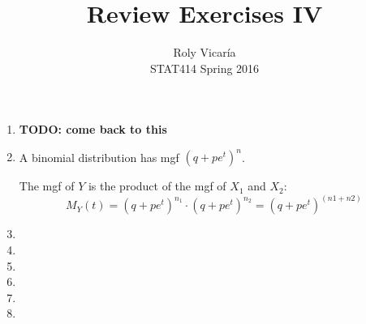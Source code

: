 \documentclass{article}
\title{Review Exercises IV}
\author{Roly Vicar\'ia \\ STAT414 Spring 2016}
\newcommand\todo[1]{\textbf{TODO: #1}}%
\begin{document}
    
    \maketitle
    \begin{enumerate}
     \item 
      \todo{come back to this}
     
     \item
      A binomial distribution has mgf $(q+pe^t)^n$. 
      
      The mgf of $Y$ is the product of the mgf of $X_1$ and $X_2$:
      $$M_Y(t) = (q+pe^t)^{n_1}\cdot (q+pe^t)^{n_2} = (q+pe^t)^{(n1+n2)}$$
     
     \item
     
     \item
     
     \item
     
     \item
     
     \item
     
     \item
    \end{enumerate}
\end{document}

